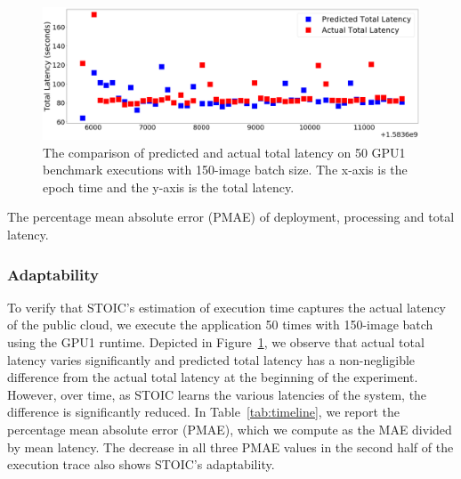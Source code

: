  \begin{figure}
    \centering
    \includegraphics[scale=0.20]{figures/timeline.png}
    \caption{The comparison of predicted and actual total latency on 50 GPU1 benchmark executions with 150-image batch size. The x-axis is the epoch time and the y-axis is the total latency. \label{fig:timeline}}
\end{figure}

\begin{table}
\centering

\caption{The percentage mean absolute error (PMAE) of deployment, processing and total latency.  \label{tab:timeline}}
\end{table}
 
 \subsubsection{Adaptability}
 
To verify that STOIC's estimation of execution time captures the actual
latency of the public cloud, we execute the application 50 times
with 150-image batch using the GPU1 runtime. Depicted in
Figure~\ref{fig:timeline}, we observe that actual total latency varies
significantly and predicted total latency has a non-negligible difference from
the actual total latency at the beginning of the experiment. However, over
time, as STOIC learns the various latencies of the system, the difference is
significantly reduced. In Table~\ref{tab:timeline}, we report the percentage
mean absolute error (PMAE), which we compute as the MAE divided by mean
latency. The decrease in all three PMAE values in the second half of the
execution trace also shows STOIC's adaptability.

